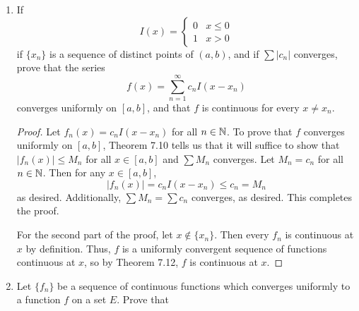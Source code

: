 \documentclass[../psets.tex]{subfiles}
\begin{document}
\begin{enumerate}[label={\textbf{\arabic*.}}]
\begin{proof}
\begin{align*}
            &= \epsilon
        \end{align*}
        \endgroup
        as desired.\par
        To prove that the series does not converge absolutely for any value of $x$, let $x\in\R$ be arbitrary. Then
        \begin{align*}
            \sum_{n=1}^\infty\left| (-1)^n\frac{x^2+n}{n^2} \right| &= x^2\sum_{n=1}^\infty\frac{1}{n^2}+\sum_{n=1}^\infty\frac{1}{n}\\
            &\geq \sum_{n=1}^\infty\frac{1}{n}
        \end{align*}
        where the latter series diverges by Theorem 3.28, yielding the desired result.
    \end{proof}
    \item If
    \begin{equation*}
        I(x) =
        \begin{cases}
            0 & x\leq 0\\
            1 & x>0
        \end{cases}
    \end{equation*}
    if $\{x_n\}$ is a sequence of distinct points of $(a,b)$, and if $\sum|c_n|$ converges, prove that the series
    \begin{equation*}
        f(x) = \sum_{n=1}^\infty c_nI(x-x_n)
    \end{equation*}
    converges uniformly on $[a,b]$, and that $f$ is continuous for every $x\neq x_n$.
    \begin{proof}
        Let $f_n(x)=c_nI(x-x_n)$ for all $n\in\mathbb{N}$. To prove that $f$ converges uniformly on $[a,b]$, Theorem 7.10 tells us that it will suffice to show that $|f_n(x)|\leq M_n$ for all $x\in[a,b]$ and $\sum M_n$ converges. Let $M_n=c_n$ for all $n\in\mathbb{N}$. Then for any $x\in[a,b]$,
        \begin{equation*}
            |f_n(x)| = c_nI(x-x_n) \leq c_n = M_n
        \end{equation*}
        as desired. Additionally, $\sum M_n=\sum c_n$ converges, as desired. This completes the proof.\par
        For the second part of the proof, let $x\notin\{x_n\}$. Then every $f_n$ is continuous at $x$ by definition. Thus, $f$ is a uniformly convergent sequence of functions continuous at $x$, so by Theorem 7.12, $f$ is continuous at $x$.
    \end{proof}
    \item Let $\{f_n\}$ be a sequence of continuous functions which converges uniformly to a function $f$ on a set $E$. Prove that

\end{enumerate}
\end{document}
